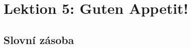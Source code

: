 \setchaptertoc
\chapter{Lektion 5: Guten Appetit!}\label{NJ:chap_N1_L5}
  
  \section*{Slovní zásoba}

      


















































